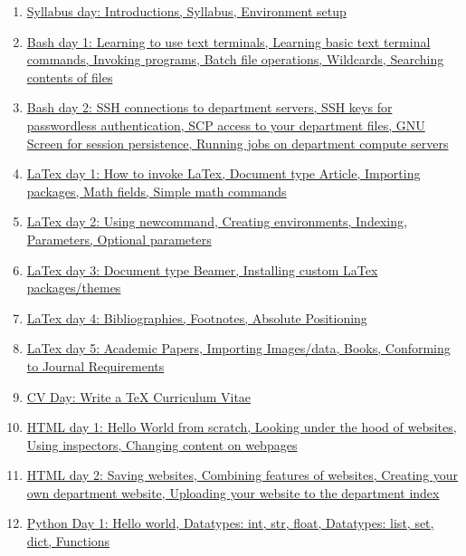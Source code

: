 \documentclass[11pt]{article}
\begin{document}
\begin{enumerate}
	\item \href{https://mp.weixin.qq.com/s/bKBknAIo4JnKjTawyUgqBw}{Syllabus day: Introductions, Syllabus, Environment setup}	%
	\item \href{https://mp.weixin.qq.com/s/xnrWv2AKV9J6KX97LdsMig}{Bash day 1: Learning to use text terminals, Learning basic text terminal commands, Invoking programs, Batch file operations, Wildcards, Searching contents of files}	%
	\item \href{https://mp.weixin.qq.com/s/oXpHJsKV-y6mEPLvdC7gRQ}{Bash day 2: SSH connections to department servers, SSH keys for passwordless authentication, SCP access to your department files, GNU Screen for session persistence, Running jobs on department compute servers}	%
	\item \href{https://mp.weixin.qq.com/s/92Z_C40M7pNS4lXaJo_nhw}{LaTex day 1: How to invoke LaTex, Document type Article, Importing packages, Math fields, Simple math commands}	%
	\item \href{https://mp.weixin.qq.com/s/kHXe8c_7YNcj19ptoUJDkg}{LaTex day 2: Using newcommand, Creating environments, Indexing, Parameters, Optional parameters}	%
	\item \href{https://mp.weixin.qq.com/s/6Qd9xPNoooe0be5KLMo9jg}{LaTex day 3: Document type Beamer, Installing custom LaTex packages/themes}	%
	\item \href{https://mp.weixin.qq.com/s/Q25tc4L5EzkxXoZPqauB6Q}{LaTex day 4: Bibliographies, Footnotes, Absolute Positioning}	%
	\item \href{https://mp.weixin.qq.com/s/2M8AwvSBVznOedDn5PIxhw}{LaTex day 5: Academic Papers, Importing Images/data, Books, Conforming to Journal Requirements}	%
	\item \href{https://mp.weixin.qq.com/s/-aKbz08lZ6i3MvU6uLsCsw}{CV Day: Write a TeX Curriculum Vitae}	%
	\item \href{https://mp.weixin.qq.com/s/ictf_tOmvE1AaEYPLbBcZw}{HTML day 1: Hello World from scratch, Looking under the hood of websites, Using inspectors, Changing content on webpages}	%
	\item \href{https://mp.weixin.qq.com/s/S5AMDeA1YkZFptYX3qMOBQ}{HTML day 2: Saving websites, Combining features of websites, Creating your own department website, Uploading your website to the department index}	%
	\item \href{https://mp.weixin.qq.com/s/26x8F177IQIW9-rK-4uH2Q}{Python Day 1: Hello world,	Datatypes: int, str, float, Datatypes: list, set, dict, Functions}	%

\end{enumerate}
\end{document}
